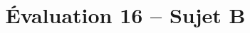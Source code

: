 \documentclass[a4paper]{article}
\begin{document}
\title{Évaluation 16 -- Sujet B}

\pagestyle{empty}

\date{}
\author{}

\maketitle{}

\thispagestyle{empty}

%
%
\end{document}
